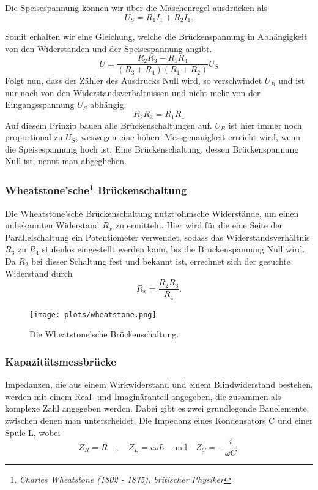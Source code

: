 Die Speisespannung können wir über die Maschenregel ausdrücken als 
\begin{equation*}
    U_S = R_1I_1 + R_2I_1.
\end{equation*}

Somit erhalten wir eine Gleichung, welche die Brückenspannung in Abhängigkeit von den Widerständen und der Speisespannung angibt.
\begin{equation}
    U = \frac{R_2R_3 - R_1R_4}{(R_3 + R_4)(R_1 + R_2)}U_S
    \label{eqn:verhmitspeise}
\end{equation}
Folgt nun, dass der Zähler des Ausdrucks Null wird, so verschwindet $U_B$ und ist nur noch von den Widerstandsverhältnissen und nicht mehr
von der Eingangsspannung $U_S$ abhängig. 
\begin{equation}
    R_2R_3 = R_1R_4
    \label{eqn:abgeglichenOhm}
\end{equation}
Auf diesem Prinzip bauen alle Brückenschaltungen auf. %
$U_B$ ist hier immer noch proportional zu $U_S$, weswegen eine höhere Messgenauigkeit erreicht wird, wenn 
die Speisespannung hoch ist.
Eine Brückenschaltung, dessen Brückenspannung Null ist, nennt man abgeglichen.

\subsubsection{Wheatstone'sche\footnote{\textit{Charles Wheatstone (1802 - 1875), britischer Physiker}} Brückenschaltung}
Die Wheatstone'sche Brückenschaltung nutzt ohmsche Widerstände, um einen unbekannten Widerstand $R_x$ zu ermitteln.
Hier wird für die eine Seite der Parallelschaltung ein Potentiometer verwendet, sodass das Widerstandsverhältnis $R_3$ zu $R_4$ stufenlos eingestellt werden kann, 
bis die Brückenspannung Null wird.
Da $R_2$ bei dieser Schaltung fest und bekannt ist, errechnet sich der gesuchte Widerstand durch
\begin{equation}
    R_x = \frac{R_2R_3}{R_4}.
    \label{eqn:wheatstone}
\end{equation}
\pagebreak
\begin{figure}
    \centering
    \texttt{[image: plots/wheatstone.png]}
    \caption{Die Wheatstone'sche Brückenschaltung.}
    \label{fig:wheatstone}
\end{figure}

\subsubsection{Kapazitätsmessbrücke}
Impedanzen, die aus einem Wirkwiderstand und einem Blindwiderstand bestehen, werden mit einem Real- und Imaginäranteil angegeben, die zusammen als
komplexe Zahl angegeben werden. Dabei gibt es zwei grundlegende Bauelemente, zwischen denen man unterscheidet.
Die Impedanz eines Kondensators C und einer Spule L, wobei
\begin{equation*}
    Z_R = R
    \quad\mathrm{,}\quad
    Z_L = i\omega L
    \quad\mathrm{und}\quad 
    Z_C = -\frac{i}{\omega C}  .
\end{equation*}

